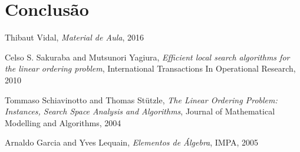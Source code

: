 \documentclass[a4paper,10pt,onecolumn]{article}
\begin{document}
\section{Conclusão}

\begin{thebibliography}{99}
 Thibaut Vidal, \emph{Material de Aula}, 2016

 Celso S. Sakuraba and Mutsunori Yagiura,
\emph{Efficient local search algorithms for the linear ordering problem},
International Transactions In Operational Research, 2010

 Tommaso Schiavinotto and Thomas Stützle, \emph{The Linear
Ordering Problem: Instances, Search Space Analysis and Algorithms}, Journal of
Mathematical Modelling and Algorithms, 2004

 Arnaldo Garcia and Yves Lequain, \emph{Elementos de
Álgebra}, IMPA, 2005


\end{thebibliography}
\end{document}
